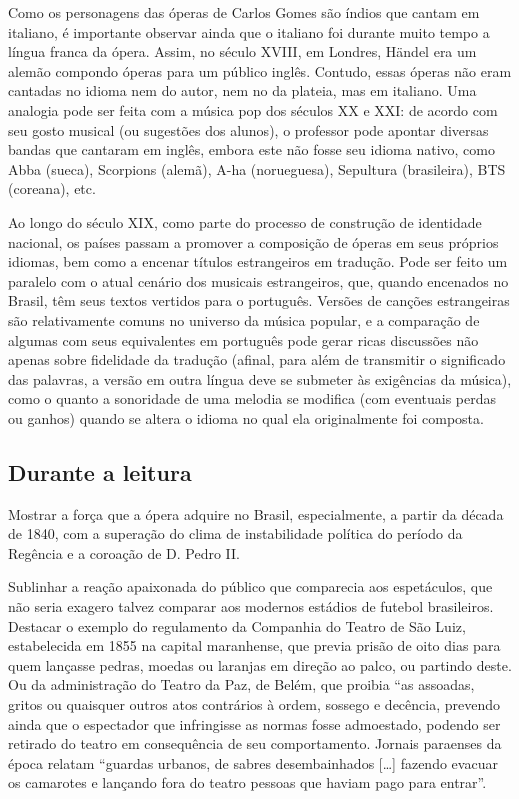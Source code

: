 \documentclass[11pt]{extarticle}
\begin{document}
Como os personagens das óperas de Carlos Gomes são índios que cantam em
italiano, é importante observar ainda que o italiano foi durante muito tempo a
língua franca da ópera. Assim, no século XVIII, em Londres, Händel era um
alemão compondo óperas para um público inglês. Contudo, essas óperas não eram
cantadas no idioma nem do autor, nem no da plateia, mas em italiano. Uma
analogia pode ser feita com a música pop dos séculos XX e XXI: de acordo com
seu gosto musical (ou sugestões dos alunos), o professor pode apontar diversas
bandas que cantaram em inglês, embora este não fosse seu idioma nativo, como
Abba (sueca), Scorpions (alemã), A-ha (norueguesa), Sepultura (brasileira), BTS
(coreana), etc. 

Ao longo do século XIX, como parte do processo de construção de identidade
nacional, os países passam a promover a composição de óperas em seus próprios
idiomas, bem como a encenar títulos estrangeiros em tradução. Pode ser feito um
paralelo com o atual cenário dos musicais estrangeiros, que, quando encenados
no Brasil, têm seus textos vertidos para o português. Versões de canções
estrangeiras são relativamente comuns no universo da música popular, e a
comparação de algumas com seus equivalentes em português pode gerar ricas
discussões não apenas sobre fidelidade da tradução (afinal, para além de
transmitir o significado das palavras, a versão em outra língua deve se
submeter às exigências da música), como o quanto a sonoridade de uma melodia se
modifica (com eventuais perdas ou ganhos) quando se altera o idioma no qual ela
originalmente foi composta. 

\subsection{Durante a leitura}

Mostrar a força que a ópera adquire no Brasil, especialmente, a partir da
década de 1840, com a superação do clima de instabilidade política do período
da Regência e a coroação de D. Pedro II.

Sublinhar a reação apaixonada do público que comparecia aos espetáculos, que
não seria exagero talvez comparar aos modernos estádios de futebol brasileiros.
Destacar o exemplo do regulamento da Companhia do Teatro de São Luiz,
estabelecida em 1855 na capital maranhense, que previa prisão de oito dias para
quem lançasse pedras, moedas ou laranjas em direção ao palco, ou partindo
deste. Ou da administração do Teatro da Paz, de Belém, que proibia “as
assoadas, gritos ou quaisquer outros atos contrários à ordem, sossego e
decência, prevendo ainda que o espectador que infringisse as normas fosse
admoestado, podendo ser retirado do teatro em consequência de seu
comportamento. Jornais paraenses da época relatam “guardas urbanos, de sabres
desembainhados […] fazendo evacuar os camarotes e lançando fora do teatro
pessoas que haviam pago para entrar”.
\end{document}
